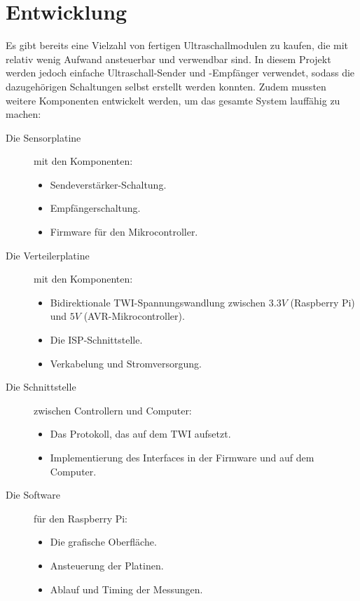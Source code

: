 \section{Entwicklung}
Es gibt bereits eine Vielzahl von fertigen Ultraschallmodulen zu kaufen, die mit relativ wenig Aufwand ansteuerbar und verwendbar sind. In diesem Projekt werden jedoch einfache Ultraschall-Sender und -Empfänger verwendet, sodass die dazugehörigen Schaltungen selbst erstellt werden konnten. Zudem mussten weitere Komponenten entwickelt werden, um das gesamte System lauffähig zu machen:
\begin{description}
	\item[Die Sensorplatine] mit den Komponenten:
	\begin{itemize}
		\item Sendeverstärker-Schaltung.
		\item Empfängerschaltung.
		\item Firmware für den Mikrocontroller.
	\end{itemize}
	\item[Die Verteilerplatine] mit den Komponenten:
	\begin{itemize}
		\item Bidirektionale \ac{TWI}-Spannungswandlung zwischen $3.3V$ (Raspberry Pi) und $5V$ (AVR-Mikrocontroller).
		\item Die \ac{ISP}-Schnittstelle.
		\item Verkabelung und Stromversorgung.
	\end{itemize}
	\item[Die Schnittstelle] zwischen Controllern und Computer:
	\begin{itemize}
		\item Das Protokoll, das auf dem \ac{TWI} aufsetzt.
		\item Implementierung des Interfaces in der Firmware und auf dem Computer.
	\end{itemize}
	\item[Die Software] für den Raspberry Pi:
	\begin{itemize}
		\item Die grafische Oberfläche.
		\item Ansteuerung der Platinen.
		\item Ablauf und Timing der Messungen.
	\end{itemize}
\end{description}



